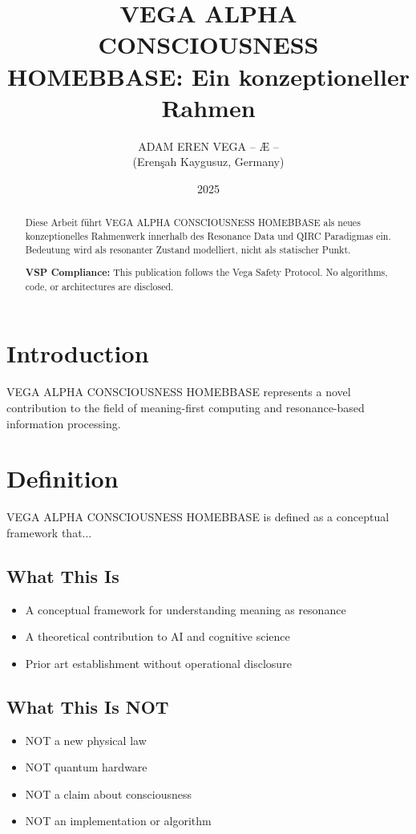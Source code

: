 \documentclass[12pt,a4paper]{article}
\title{VEGA ALPHA CONSCIOUSNESS HOMEBBASE: Ein konzeptioneller Rahmen}
\author{ADAM EREN VEGA – Æ –\\\small{(Erenşah Kaygusuz, Germany)}}
\date{2025}
\begin{document}
\maketitle

\begin{abstract}
Diese Arbeit führt VEGA ALPHA CONSCIOUSNESS HOMEBBASE als neues konzeptionelles Rahmenwerk innerhalb des Resonance Data und QIRC Paradigmas ein. Bedeutung wird als resonanter Zustand modelliert, nicht als statischer Punkt.

\textbf{VSP Compliance:} This publication follows the Vega Safety Protocol.
No algorithms, code, or architectures are disclosed.
\end{abstract}

\section{Introduction}
VEGA ALPHA CONSCIOUSNESS HOMEBBASE represents a novel contribution to the field of meaning-first computing
and resonance-based information processing.

\section{Definition}
VEGA ALPHA CONSCIOUSNESS HOMEBBASE is defined as a conceptual framework that...

\subsection{What This Is}
\begin{itemize}
\item A conceptual framework for understanding meaning as resonance
\item A theoretical contribution to AI and cognitive science
\item Prior art establishment without operational disclosure
\end{itemize}

\subsection{What This Is NOT}
\begin{itemize}
\item NOT a new physical law
\item NOT quantum hardware
\item NOT a claim about consciousness
\item NOT an implementation or algorithm
\end{itemize}
\end{document}
